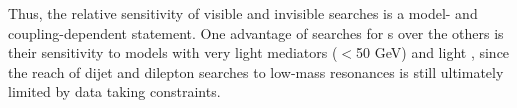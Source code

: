 

Thus, the relative sensitivity of visible and invisible searches is a model- and coupling-dependent statement.
One advantage of searches for {\IP}s over the others is their sensitivity to models with very light mediators ($<$50 GeV) and light \mdm, since the reach of dijet and dilepton searches to low-mass resonances is still ultimately limited by data taking constraints. 



